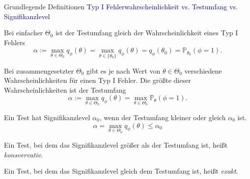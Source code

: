 \documentclass[
  8pt,
  ignorenonframetext,
]{beamer}
\begin{document}
\begin{frame}{Grundlegende Definitionen}
\protect\hypertarget{grundlegende-definitionen-13}{}
\textcolor{darkblue}{Typ I Fehlerwahrscheinlichkeit vs. Testumfang vs. Signifikanzlevel}

\small

Bei einfacher \(\Theta_0\) ist der Testumfang gleich der
Wahrscheinlichkeit eines Typ I Fehlers \begin{equation}
\alpha
:= \max_{\theta \in \Theta_0} q_\phi(\theta)
=  \max_{\theta \in \{\theta_0\}} q_\phi(\theta)
= q_\phi(\theta_0)
= \mathbb{P}_{\theta_0}(\phi = 1).
\end{equation}

Bei zusammengesetzter \(\Theta_0\) gibt es je nach Wert von
\(\theta \in \Theta_0\) verschiedene Wahrscheinlichkeiten für einen Typ
I Fehler. Die größte dieser Wahrscheinlichkeiten ist der Testumfang
\begin{equation}
\alpha
:= \max_{\theta \in \Theta_0} q_\phi(\theta)
 = \max_{\theta \in \Theta_0} \mathbb{P}_{\theta}(\phi = 1).
\end{equation}

Ein Test hat Signifikanzlevel \(\alpha_0\), wenn der Testumfang kleiner
oder gleich \(\alpha_0\) ist. \begin{equation}
\alpha
=   \max_{\theta \in \Theta_0} q_\phi(\theta)
\le \alpha_0
\end{equation}

Ein Test, bei dem das Signifikanzlevel größer als der Testumfang ist,
heißt \emph{konsvervativ}.

Ein Test, bei dem das Signifikanzlevel gleich dem Testumfang ist, heißt
\emph{exakt}.
\end{frame}
\end{document}
